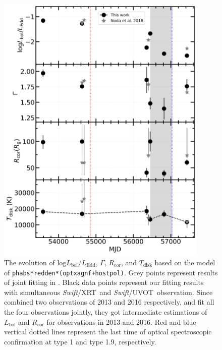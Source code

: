 \documentclass[twocolumn]{aastex63}
\newcommand{\xrt}{{\small {\it Swift}/XRT}}
\newcommand{\uvot}{{\small {\it Swift}/UVOT}}
\begin{document}
\begin{figure}
\centering
	\includegraphics[width=0.9\textwidth]{./pic/Mrk1018_disk_time_evolution.png}
    \caption{The evolution of log$L_\mathrm{bol}/L_\mathrm{Edd}$, $\Gamma$, $R_\mathrm{cor}$, and $T_\mathrm{disk}$ based on the model of \texttt{phabs*redden*(optxagnf+hostpol)}. Grey points represent results of joint fitting in \citep{2018MNRAS.480.3898N}. Black data points represent our fitting results with simultaneous \xrt\, and \uvot\, observation. Since \citep{2018MNRAS.480.3898N} combined two observations of 2013 and 2016 respectively, and fit all the four observations jointly, they got intermediate estimations of $L_\mathrm{bol}$ and $R_\mathrm{cor}$ for observations in 2013 and 2016. Red and blue vertical dotted lines represent the last time of optical spectroscopic confirmation at type 1 and type 1.9, respectively.}
    \label{fig:disk_evoliton}
\end{figure}
\end{document}
